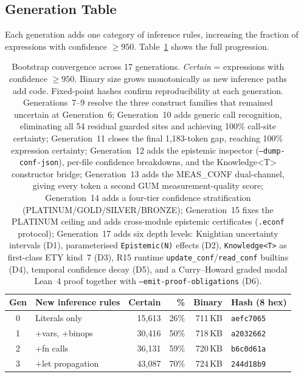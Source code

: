 \documentclass[acmsmall,screen,review,anonymous]{acmart}
\begin{document}
\subsection{Generation Table}

Each generation adds one category of inference rules, increasing the
fraction of expressions with confidence $\geq 950$.
Table~\ref{tab:generations} shows the full progression.

\begin{table}[t]
\centering
\caption{%
  Bootstrap convergence across 17 generations.
  \emph{Certain} = expressions with confidence $\geq 950$.
  Binary size grows monotonically as new inference paths add code.
  Fixed-point hashes confirm reproducibility at each generation.
  Generations~7--9 resolve the three construct families that remained
  uncertain at Generation~6; Generation~10 adds generic call recognition,
  eliminating all 54 residual guarded sites and achieving 100\%
  call-site certainty; Generation~11 closes the final 1,183-token gap,
  reaching 100\% expression certainty; Generation~12 adds the epistemic
  inspector (\texttt{--dump-conf-json}), per-file confidence breakdowns,
  and the Knowledge\textless T\textgreater{} constructor bridge;
  Generation~13 adds the MEAS\_CONF dual-channel, giving every token a
  second GUM measurement-quality score; Generation~14 adds a four-tier
  confidence stratification (PLATINUM/GOLD/SILVER/BRONZE);
  Generation~15 fixes the PLATINUM ceiling and adds cross-module
  epistemic certificates (\texttt{.econf} protocol);
  Generation~17 adds six depth levels: Knightian uncertainty intervals (D1),
  parameterised \texttt{Epistemic(N)} effects (D2),
  \texttt{Knowledge\textless T\textgreater{}} as first-class ETY kind~7 (D3),
  R15 runtime \texttt{update\_conf}/\texttt{read\_conf} builtins (D4),
  temporal confidence decay (D5), and a Curry--Howard graded modal
  Lean~4 proof together with \texttt{--emit-proof-obligations} (D6).
}
\label{tab:generations}
\begin{tabular}{@{}clrrrl@{}}
\toprule
Gen & New inference rules & Certain & \% & Binary & Hash (8 hex) \\
\midrule
0 & Literals only             &  15,613 & 26\% & 711\,KB & \texttt{aefc7065} \\
1 & +vars, +binops            &  30,416 & 50\% & 718\,KB & \texttt{a2032662} \\
2 & +fn calls                 &  36,131 & 59\% & 720\,KB & \texttt{b6c0d61a} \\
3 & +let propagation          &  43,087 & 70\% & 724\,KB & \texttt{244d18b9} \\

\end{tabular}
\end{table}
\end{document}
